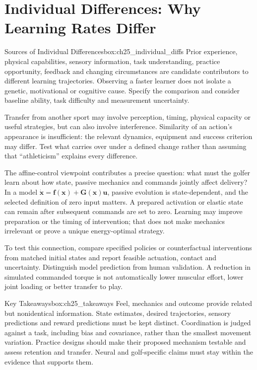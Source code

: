 \section{Individual Differences: Why Learning Rates Differ}
\label{sec:ch25_individual_differences}

\begin{principle}{Sources of Individual Differences}{box:ch25_individual_diffs}
Prior experience, physical capabilities, sensory information, task understanding, practice opportunity, feedback and changing circumstances are candidate contributors to different learning trajectories. Observing a faster learner does not isolate a genetic, motivational or cognitive cause. Specify the comparison and consider baseline ability, task difficulty and measurement uncertainty.
\end{principle}

Transfer from another sport may involve perception, timing, physical capacity or useful strategies, but can also involve interference. Similarity of an action's appearance is insufficient: the relevant dynamics, equipment and success criterion may differ. Test what carries over under a defined change rather than assuming that ``athleticism'' explains every difference.

The affine-control viewpoint contributes a precise question: what must the golfer learn about how state, passive mechanics and commands jointly affect delivery? In a model $\dot{\bm{x}}=\bm{f}(\bm{x})+\bm{G}(\bm{x})\bm{u}$, passive evolution is state-dependent, and the selected definition of zero input matters. A prepared activation or elastic state can remain after subsequent commands are set to zero. Learning may improve preparation or the timing of intervention; that does not make mechanics irrelevant or prove a unique energy-optimal strategy.

To test this connection, compare specified policies or counterfactual interventions from matched initial states and report feasible actuation, contact and uncertainty. Distinguish model prediction from human validation. A reduction in simulated commanded torque is not automatically lower muscular effort, lower joint loading or better transfer to play.

\begin{principle}{Key Takeaways}{box:ch25_takeaways}
Feel, mechanics and outcome provide related but nonidentical information. State estimates, desired trajectories, sensory predictions and reward predictions must be kept distinct. Coordination is judged against a task, including bias and covariance, rather than the smallest movement variation. Practice designs should make their proposed mechanism testable and assess retention and transfer. Neural and golf-specific claims must stay within the evidence that supports them.
\end{principle}

